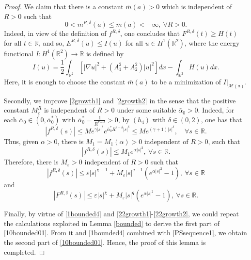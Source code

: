 \documentclass[11pt]{amsart}
\numberwithin{equation}{section}
\theoremstyle{definition}
\newcommand{\R}{\mathbb{R}}
\begin{document}
\begin{proof}
We claim that there is a constant $\bar{m}(a)>0$ which is independent of $R>0$ such that
\begin{equation}\label{1bounded4}
0<m^{R,{\delta}}(a)\leq \bar{m}(a)<+\infty,~\forall R>0.
\end{equation}
Indeed, in view of the definition of $f^{R,\delta}$, one concludes that $F^{R,\delta}(t)\geq H(t)$
for all $t\in\R$, and so, $E^{R,\delta}(u)\leq I(u)$ for all $u\in H^1(\R^2)$, where the
energy functional $I:H^1(\R^2)\to\R$ is defined by
\begin{equation}\label{hhh}
I(u)=\frac{1}{2}\int_{\R^2}[|\nabla u|^2 + (A_1^2+A_2^2)|u|^2]dx-
\int_{\R^2}H(u)dx.
\end{equation}
Here, it is enough to choose the constant $\bar{m}(a)$ to be a minimization of $I|_{\mathcal{M}(a)}$.

Secondly, we improve \eqref{2growth1} and \eqref{2growth2}
in the sense that the positive constant $M_\varepsilon^R$ is independent of $R>0$
 under some suitable $\bar{\alpha}_0>0$. Indeed, for each $\bar{\alpha}_0\in(0,\bar{\alpha}_0^*)$ with
$\bar{\alpha}_0^*=\frac{1}{R^{\tau-\delta}}>0$, by $(h_4)$ with $\delta\in(0,2)$, one has that
\[
|f^{R,\delta}(s)|\leq Me^{\gamma |s|^\delta}e^{\bar{\alpha}_0^* R^{\tau-\delta} |s|^\delta}
\leq M e^{(\gamma + 1)|s|^\delta}, \quad \forall s \in \mathbb{R}.
\]
Thus, given $\alpha>0$, there is $M_1=M_1(\alpha)>0$ independent of $R>0$, such that
\[
|f^{R,\delta}(s)| \leq M_1e^{\alpha |s|^2}, ~\forall s\in\R.
\]
Therefore, there is $M_\varepsilon>0$ independent of $R>0$ such that
\begin{equation}\label{22growth1}
  |f^{R,\delta}(s)|\leq \varepsilon |s|^{\chi-1}+M_\varepsilon|s|^{q-1}(e^{\alpha |s|^2}-1),~\forall s\in\R
\end{equation}
and
\begin{equation}\label{22growth2}
  |F^{R,\delta}(s)|\leq \varepsilon |s|^{\chi }+M_\varepsilon|s|^{q }(e^{\alpha |s|^2}-1),~\forall s\in\R.
\end{equation}

Finally, by virtue of \eqref{1bounded4} and \eqref{22growth1}-\eqref{22growth2},
we could repeat the calculations exploited in Lemma \ref{bounded}
to derive the first part of \eqref{10bounded01}. From it and \eqref{1bounded4} combined with \eqref{PSsequence1}, we obtain the
second part of \eqref{10bounded01}. Hence,
the proof of this lemma is completed.
 \end{proof}
\end{document}
